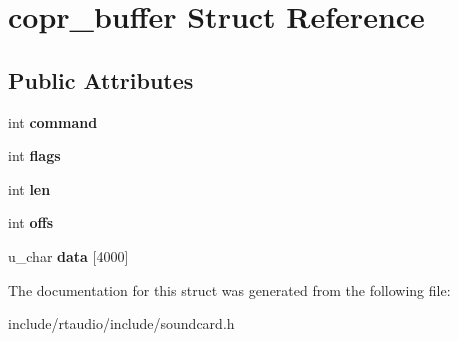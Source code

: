 \hypertarget{structcopr__buffer}{}\section{copr\+\_\+buffer Struct Reference}
\label{structcopr__buffer}
\subsection*{Public Attributes}
\begin{DoxyCompactItemize}
\item 
int {\bfseries command}\hypertarget{structcopr__buffer_a7baefa2fec42cd024e99e81737b29c07}{}\label{structcopr__buffer_a7baefa2fec42cd024e99e81737b29c07}

\item 
int {\bfseries flags}\hypertarget{structcopr__buffer_af12a0968d07c9bc14b24cc4bd8a605f3}{}\label{structcopr__buffer_af12a0968d07c9bc14b24cc4bd8a605f3}

\item 
int {\bfseries len}\hypertarget{structcopr__buffer_a8f8d7ee576adc5b2fd974c72dd0e8071}{}\label{structcopr__buffer_a8f8d7ee576adc5b2fd974c72dd0e8071}

\item 
int {\bfseries offs}\hypertarget{structcopr__buffer_a441caa30a9ab11564866a4559f0e9e7d}{}\label{structcopr__buffer_a441caa30a9ab11564866a4559f0e9e7d}

\item 
u\+\_\+char {\bfseries data} \mbox{[}4000\mbox{]}\hypertarget{structcopr__buffer_aa204e9d11cf0e7e2e3fd70d91b6e929e}{}\label{structcopr__buffer_aa204e9d11cf0e7e2e3fd70d91b6e929e}

\end{DoxyCompactItemize}


The documentation for this struct was generated from the following file\+:\begin{DoxyCompactItemize}
\item 
include/rtaudio/include/soundcard.\+h\end{DoxyCompactItemize}
